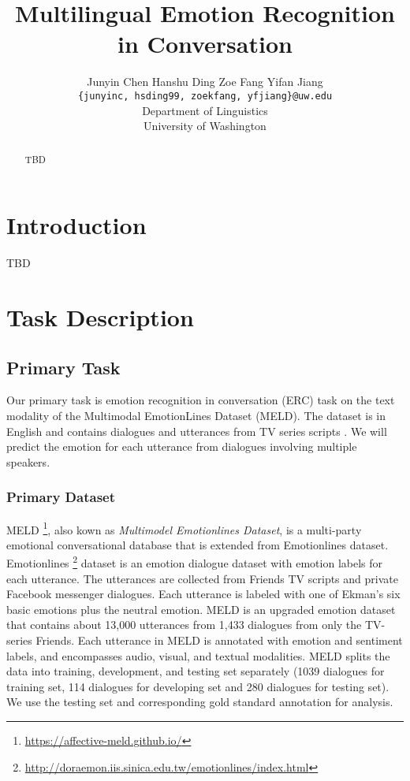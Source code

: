 \documentclass[11pt]{article}
\title{Multilingual Emotion Recognition in Conversation}
\author{Junyin Chen {} {} {} Hanshu Ding {} {} {} Zoe Fang {} {} {} Yifan Jiang \\
		\texttt{\{junyinc, hsding99, zoekfang, yfjiang\}@uw.edu} \\
        Department of Linguistics \\ University of Washington}
\begin{document}
\maketitle
\begin{abstract}
  TBD
\end{abstract}

\section{Introduction}
TBD

\section{Task Description}

\subsection{Primary Task}
\label{sect:primary_task}

Our primary task is emotion recognition in conversation (ERC) task on the text modality of the Multimodal EmotionLines Dataset (MELD). The dataset is in English and contains dialogues and utterances from TV series scripts . We will predict the emotion for each utterance from dialogues involving multiple speakers.

\subsubsection{Primary Dataset}

MELD \citep{poria-etal-2019-meld} \footnote{\url{https://affective-meld.github.io/}}, also kown as \textit{Multimodel Emotionlines Dataset}, is a multi-party emotional conversational database that is extended from Emotionlines dataset. 
Emotionlines \citep{hsu-etal-2018-emotionlines}\footnote{\url{http://doraemon.iis.sinica.edu.tw/emotionlines/index.html}} dataset is an emotion dialogue dataset with emotion labels for each utterance. The utterances are collected from Friends TV scripts and private Facebook messenger dialogues. Each utterance is labeled with one of Ekman’s six basic emotions plus the neutral emotion. MELD is an upgraded emotion dataset that contains about 13,000 utterances from 1,433 dialogues from only the TV-series Friends. Each utterance in MELD is annotated with emotion and sentiment labels, and encompasses audio, visual, and textual modalities. 
MELD splits the data into training, development, and testing set separately (1039 dialogues for training set, 114 dialogues for developing set and 280 dialogues for testing set). We use the testing set and corresponding gold standard annotation for analysis.
\end{document}
